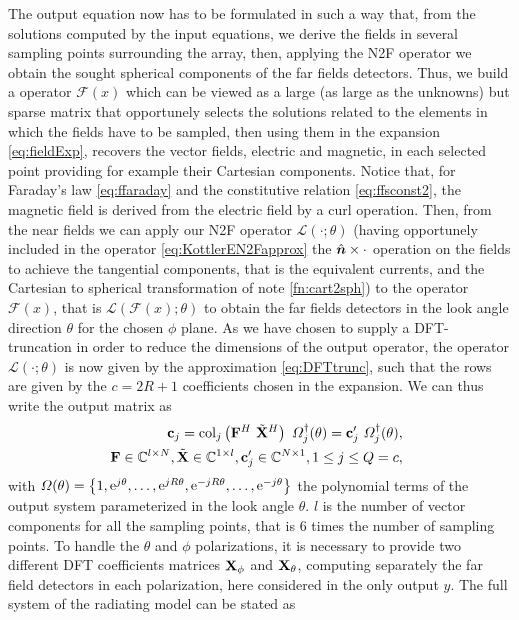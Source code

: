 \par The output equation now has to be formulated in such a way that, from the solutions computed by the input equations, we derive the fields in several sampling points surrounding the array, then, applying the N2F operator we obtain the sought spherical components of the far fields detectors. Thus, we build a  operator $\mathcal{F}(x)$ which can be viewed as a large (as large as the unknowns) but sparse matrix that opportunely selects the solutions related to the elements in which the fields have to be sampled, then using them in the expansion \eqref{eq:fieldExp}, recovers the vector fields, electric and magnetic, in each selected point providing for example their Cartesian components. Notice that, for Faraday's law \eqref{eq:ffaraday} and the constitutive relation \eqref{eq:ffsconst2}, the magnetic field is derived from the electric field by a curl operation. Then, from the near fields we can apply our N2F operator $\mathcal{L}(\cdot; \theta)$ (having opportunely included in the operator \eqref{eq:KottlerEN2Fapprox} the $\hat{\mbfit{n}} \times \cdot$ operation on the fields to achieve the tangential components, that is the equivalent currents, and the Cartesian to spherical transformation of note \ref{fn:cart2sph}) to the operator $\mathcal{F}(x)$, that is  $\mathcal{L}(\mathcal{F}(x); \theta)$  to obtain the far fields detectors in the look angle direction $\theta$ for the chosen $\phi$ plane. As we have chosen to supply a DFT-truncation in order to reduce the dimensions of the output operator, the operator $\mathcal{L}(\cdot; \theta)$ is now given by the approximation \eqref{eq:DFTtrunc}, such that the rows are given by the $c = 2 R + 1$ coefficients chosen in the expansion. We can thus write the output matrix as
\begin{eqnarray}
& & \mat{c}_j = \mrm{col}_j \left ( \mat{F}^H \ \tilde{\mat{X}}^H \right ) \ \Omega_j^\dagger (\theta) = \mat{c}'_j \ \Omega_j^\dagger (\theta), \nonumber \\
& & \hspace{-.5cm} \mat{F} \in \mathbb{C}^{l \times N}, \tilde{\mat{X}} \in \mathbb{C}^{1 \times l}, \mat{c}'_j \in \mathbb{C}^{N \times 1}, 1 \leq j \leq Q = c,
\end{eqnarray} with $\Omega (\theta) = \left \{1, \mathrm{e}^{j \theta }, \ldots, \mathrm{e}^{j R \theta }, \mathrm{e}^{- j R \theta}, \ldots,  \mathrm{e}^{- j \theta} \right \}$ the polynomial terms of the output system parameterized in the look angle $\theta$. $l$ is the number of vector components for all the sampling points, that is 6 times the number of sampling points. To handle the $\theta$ and $\phi$ polarizations, it is necessary to provide two different DFT coefficients matrices $\mathbf{X}_\phi$ and $\mathbf{X}_\theta$, computing separately the far field detectors in each polarization, here considered in the only output $y$. The full system of the radiating model can be stated as
